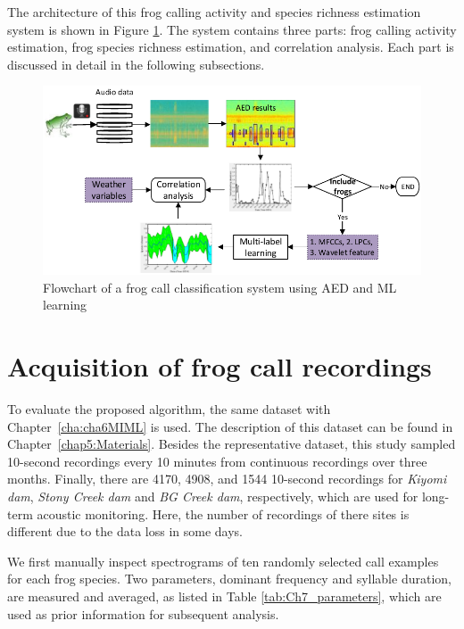   
The architecture of this frog calling activity and species richness estimation system is shown in Figure \ref{fig:Ch7_flowchart}. The system contains three parts: frog calling activity estimation, frog species richness estimation, and correlation analysis. Each part is discussed in detail in the following subsections.

\begin{figure}[htb!]
\centering
\includegraphics[width=\textwidth]{image/Ch7/flowchart.pdf}
\caption{Flowchart of a frog call classification system using AED and ML learning}
\label{fig:Ch7_flowchart}
\end{figure}


\section{Acquisition of frog call recordings}

To evaluate the proposed algorithm, the same dataset with Chapter~\ref{cha:cha6MIML} is used. The description of this dataset can be found in Chapter~\ref{chap5:Materials}. Besides the representative dataset, this study  sampled 10-second recordings every 10 minutes from continuous recordings over three months. Finally, there are 4170, 4908, and 1544 10-second recordings for \textit{Kiyomi dam}, \textit{Stony Creek dam} and \textit{BG Creek dam}, respectively, which are used for long-term acoustic monitoring. Here, the number of recordings of there sites is different due to the data loss in some days.




We first manually inspect spectrograms of ten randomly selected call examples for each frog species. Two parameters, dominant frequency and syllable duration, are measured and averaged, as listed in Table \ref{tab:Ch7_parameters}, which are used as prior information for subsequent analysis.



